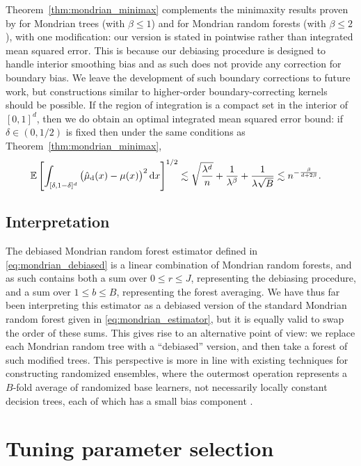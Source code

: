 Theorem~\ref{thm:mondrian_minimax} complements the minimaxity results proven by
\citet{mourtada2020minimax} for Mondrian trees (with $\beta \leq 1$) and for
Mondrian random forests (with $\beta \leq 2$), with one modification: our
version is stated in pointwise rather than integrated mean squared error. This
is because our debiasing procedure is designed to handle interior smoothing
bias and as such does not provide any correction for boundary bias. We leave
the development of such boundary corrections to future work, but constructions
similar to higher-order boundary-correcting kernels should be possible. If the
region of integration is a compact set in the interior of $[0,1]^d$, then we do
obtain an optimal integrated mean squared error bound: if $\delta \in (0, 1/2)$
is fixed then under the same conditions as Theorem~\ref{thm:mondrian_minimax},
%
\begin{align*}
  \mathbb{E} \left[
    \int_{[\delta, 1-\delta]^d}
    \big(
      \hat \mu_{\mathrm{d}}(x)
      - \mu(x)
    \big)^2
    \,\mathrm{d}x
  \right]^{1/2}
  &\lesssim
  \sqrt{\frac{\lambda^d}{n}}
  + \frac{1}{\lambda^\beta}
  + \frac{1}{\lambda \sqrt B}
  \lesssim
  n^{-\frac{\beta}{d + 2 \beta}}.
\end{align*}

\subsection{Interpretation}

The debiased Mondrian random forest estimator defined in
\eqref{eq:mondrian_debiased} is
a linear combination of Mondrian random forests, and as such contains both a
sum over $0 \leq r \leq J$, representing the debiasing procedure, and a sum
over $1 \leq b \leq B$, representing the forest averaging. We have thus far
been interpreting this estimator as a debiased version of the standard Mondrian
random forest given in \eqref{eq:mondrian_estimator}, but it is
equally valid to swap the order of these sums. This gives rise to an
alternative point of view: we replace each Mondrian random tree with a
``debiased'' version, and then take a forest of such modified trees. This
perspective is more in line with existing techniques for constructing
randomized ensembles, where the outermost operation represents a $B$-fold
average of randomized base learners, not necessarily locally constant decision
trees, each of which has a small bias component \citep{caruana2004ensemble,
zhou2019deep, friedberg2020local}.

\section{Tuning parameter selection}%
\label{sec:mondrian_parameter_selection}

